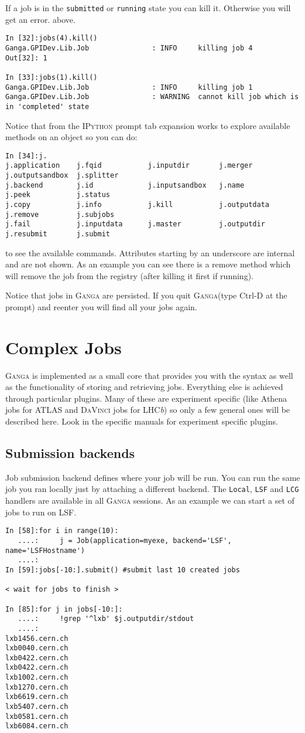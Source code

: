\documentclass{howto}
\def\ganga {\textsc{Ganga}\xspace}
\def\ipython {\textsc{IPython}\xspace}
\def\lhcb {LHC{\em b\/}\xspace}
\def\davinci {\textsc{DaVinci}\xspace}
\begin{document}
If a job is in the \texttt{submitted} or \texttt{running} state you can kill
it. Otherwise you will get an error.
above.
\begin{verbatim}
In [32]:jobs(4).kill()
Ganga.GPIDev.Lib.Job               : INFO     killing job 4
Out[32]: 1

In [33]:jobs(1).kill()
Ganga.GPIDev.Lib.Job               : INFO     killing job 1
Ganga.GPIDev.Lib.Job               : WARNING  cannot kill job which is in 'completed' state
\end{verbatim} 
Notice that from the \ipython prompt tab expansion works to explore available
methods on an object so you can do:
\begin{verbatim}
In [34]:j.
j.application    j.fqid           j.inputdir       j.merger         j.outputsandbox  j.splitter
j.backend        j.id             j.inputsandbox   j.name           j.peek           j.status
j.copy           j.info           j.kill           j.outputdata     j.remove         j.subjobs
j.fail           j.inputdata      j.master         j.outputdir      j.resubmit       j.submit
\end{verbatim} 
to see the available commands. Attributes starting by an underscore are internal and are not shown.
As an example you can see there is a remove method which will remove the job from the registry
(after killing it first if running). 

Notice that jobs in \ganga are persisted. If you quit \ganga (type Ctrl-D at
the prompt) and reenter you will find all your jobs again.

\section{Complex Jobs}
\ganga is implemented as a small core that provides you with the syntax as
well as the functionality of storing and retrieving jobs. Everything else is
achieved through particular plugins. Many of these are experiment specific
(like Athena jobs for ATLAS and \davinci jobs for \lhcb) so only a few general
ones will be described here. Look in the specific manuals for experiment
specific plugins.

\subsection{Submission backends}
Job submission backend defines where your job will be run. You can run the
same job you ran locally just by attaching a different backend. The
\texttt{Local}, \texttt{LSF} and \texttt{LCG} handlers are available in all
\ganga sessions. As an example we can start a set of jobs to run on LSF.
\begin{verbatim}
In [58]:for i in range(10):
   ....:     j = Job(application=myexe, backend='LSF', name='LSFHostname')
   ....: 
In [59]:jobs[-10:].submit() #submit last 10 created jobs

< wait for jobs to finish >

In [85]:for j in jobs[-10:]:
   ....:     !grep '^lxb' $j.outputdir/stdout
   ....:     
lxb1456.cern.ch
lxb0040.cern.ch
lxb0422.cern.ch
lxb0422.cern.ch
lxb1002.cern.ch
lxb1270.cern.ch
lxb6619.cern.ch
lxb5407.cern.ch
lxb0581.cern.ch
lxb6084.cern.ch
\end{verbatim}
\end{document}
